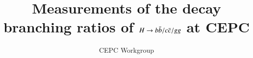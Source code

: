 \documentclass[coverpage]{cepcnote}
\title{Measurements of the decay branching ratios of $H\rightarrow b\bar{b}/c\bar{c}/gg$ at CEPC}
\author{CEPC Workgroup}
\begin{document}
\linenumbers
\tableofcontents
\clearpage





%
%



\clearpage
\pagebreak
\newpage

%



\end{document}
